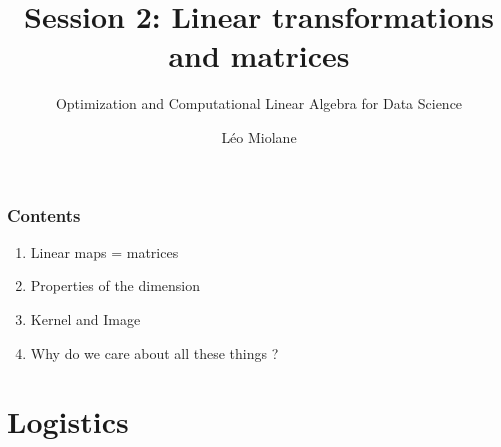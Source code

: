 \documentclass{beamer}
\title{Session 2: Linear transformations and matrices}
\subtitle{Optimization and Computational Linear Algebra for Data Science}
\author{Léo Miolane}
\date{}
\begin{document}
\setcounter{showProgressBar}{0}
\setcounter{showSlideNumbers}{0}

\frame{\titlepage}

\begin{frame}
	\frametitle{Contents}
	\begin{enumerate}
		\item Linear maps = matrices
		\item Properties of the dimension
		\item Kernel and Image
		\item Why do we care about all these things ? 
	\end{enumerate}
\end{frame}


\setcounter{framenumber}{0}
\setcounter{showSlideNumbers}{1}

\section{Logistics}

\backupend
\end{document}
